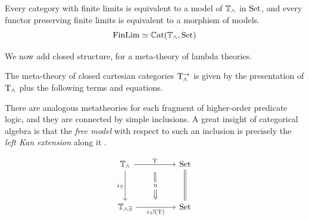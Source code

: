 \documentclass{article}
\begin{document}
\begin{proposition}
    Every category with finite limits is equivalent to a model of $\mathbb{T}_\land$ in $\mathrm{Set}$, and every functor preserving finite limits is equivalent to a morphism of models.
    \[\mathrm{FinLim}\simeq \mathbb{C}\mathrm{at}(\mathbb{T}_\land, \mathrm{Set})\]
\end{proposition}

We now add closed structure, for a meta-theory of lambda theories.

\begin{definition}
    The meta-theory of closed cartesian categories $\mathrm{T}_{\land}^\to$ is given by the presentation of $\mathrm{T}_\land$ plus the following terms and equations.
\end{definition}

There are analogous metatheories for each fragment of higher-order predicate logic, and they are connected by simple inclusions. A great insight of categorical algebra is that the \textit{free model} with respect to such an inclusion is precisely the \textit{left Kan extension} along it \cite[Section 4.4]{ttt}.

\[\begin{tikzcd}
	{\mbb{T}_\land} && {\mrm{Set}} \\
	\\
	{\mbb{T}_{\land\exists}} && {\mrm{Set}}
	\arrow[""{name=0, anchor=center, inner sep=0}, "{\T}", from=1-1, to=1-3]
	\arrow["{i_\exists}"', from=1-1, to=3-1]
	\arrow[equals, from=1-3, to=3-3]
	\arrow[""{name=1, anchor=center, inner sep=0}, "{i_\exists !(\T)}"', from=3-1, to=3-3]
	\arrow["\eta"{description}, Rightarrow, from=0, to=1, shorten=3mm]
\end{tikzcd}\]
\end{document}
